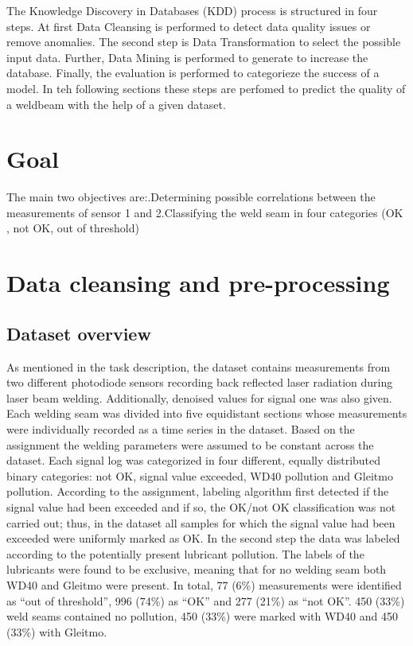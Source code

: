 \documentclass[12pt]{report}
\begin{document}
The Knowledge Discovery in Databases (KDD) process is structured in four steps. At first Data Cleansing is performed to detect data quality issues or remove anomalies. The second step is Data Transformation to select the possible input data. Further, Data Mining is performed to generate to increase the database. Finally, the evaluation is performed to categorieze the success of a model. In teh following sections these steps are perfomed to predict the quality of a weldbeam with the help of a given dataset.


\section{Goal}
The main two objectives are:\newline{}.\newline Determining possible correlations between the measurements of
sensor 1 and 2\newline{}.\newline Classifying the weld seam in four categories (OK , not OK, out of threshold)



\section{Data cleansing and pre-processing}
\subsection{Dataset overview}
As mentioned in the task description, the dataset contains measurements from two different photodiode sensors recording back reflected laser radiation during laser beam welding. Additionally, denoised values for signal one was also given. Each welding seam was divided into five equidistant sections whose measurements were individually recorded as a time series in the dataset. Based on the assignment the welding parameters were assumed to be constant across the dataset.\newline\newline
Each signal log was categorized in four different, equally distributed binary categories: not OK, signal value exceeded, WD40 pollution and Gleitmo pollution. According to the assignment, labeling algorithm first detected if the signal value had been exceeded and if so, the OK/not OK classification was not carried out; thus, in the dataset all samples for which the signal value had been exceeded were uniformly marked as OK. In the second step the data was labeled according to the potentially present lubricant pollution. The labels of the lubricants were found to be exclusive, meaning that for no welding seam both WD40 and Gleitmo were present. In total, 77 (6\%) measurements were identified as “out of threshold”, 996 (74\%) as “OK” and 277 (21\%) as “not OK”. 450 (33\%) weld seams contained no pollution, 450 (33\%) were marked with WD40 and 450 (33\%) with Gleitmo.
\end{document}
